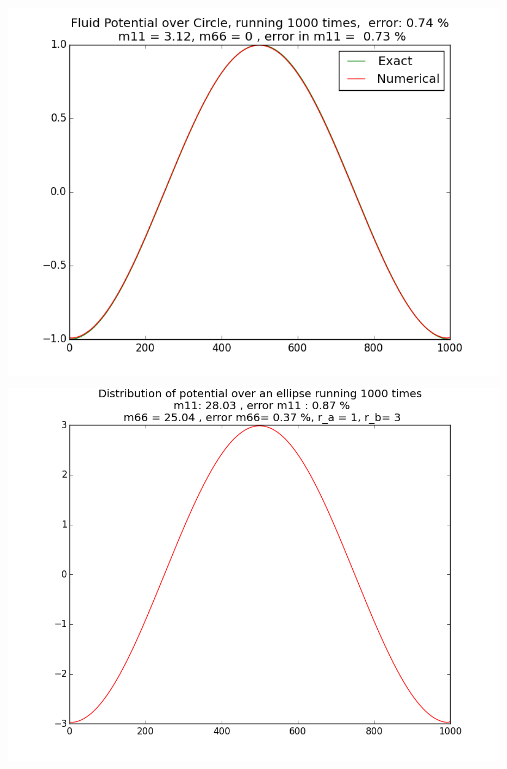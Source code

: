 \documentclass[a4paper,norsk]{article}
\begin{document}
\newpage
\includegraphics[width=13cm, height=10cm]{Circle}
\newline
\includegraphics[width=13cm, height=10cm]{ellipse}
\end{document}
